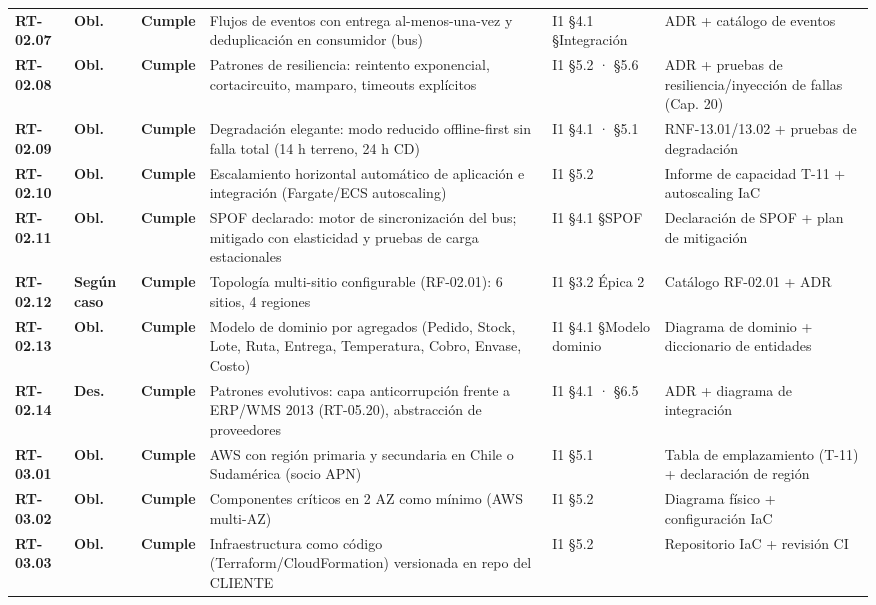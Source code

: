 \begin{small}
\begin{longtable}{@{}p{1.35cm} p{1.15cm} p{1.15cm} p{4.6cm} p{2.35cm} p{3.8cm}@{}}
\textbf{RT-02.07} & \textbf{Obl.} & \textbf{Cumple} & Flujos de eventos con entrega al-menos-una-vez y deduplicaci\'on en consumidor (bus) & I1 §4.1 §Integraci\'on & ADR + cat\'alogo de eventos \\
\textbf{RT-02.08} & \textbf{Obl.} & \textbf{Cumple} & Patrones de resiliencia: reintento exponencial, cortacircuito, mamparo, timeouts expl\'icitos & I1 §5.2 · §5.6 & ADR + pruebas de resiliencia/inyecci\'on de fallas (Cap. 20) \\
\textbf{RT-02.09} & \textbf{Obl.} & \textbf{Cumple} & Degradaci\'on elegante: modo reducido offline-first sin falla total (14 h terreno, 24 h CD) & I1 §4.1 · §5.1 & RNF-13.01/13.02 + pruebas de degradaci\'on \\
\textbf{RT-02.10} & \textbf{Obl.} & \textbf{Cumple} & Escalamiento horizontal autom\'atico de aplicaci\'on e integraci\'on (Fargate/ECS autoscaling) & I1 §5.2 & Informe de capacidad T-11 + autoscaling IaC \\
\textbf{RT-02.11} & \textbf{Obl.} & \textbf{Cumple} & SPOF declarado: motor de sincronizaci\'on del bus; mitigado con elasticidad y pruebas de carga estacionales & I1 §4.1 §SPOF & Declaraci\'on de SPOF + plan de mitigaci\'on \\
\textbf{RT-02.12} & \textbf{Según caso} & \textbf{Cumple} & Topolog\'ia multi-sitio configurable (RF-02.01): 6 sitios, 4 regiones & I1 §3.2 \'Epica 2 & Cat\'alogo RF-02.01 + ADR \\
\textbf{RT-02.13} & \textbf{Obl.} & \textbf{Cumple} & Modelo de dominio por agregados (Pedido, Stock, Lote, Ruta, Entrega, Temperatura, Cobro, Envase, Costo) & I1 §4.1 §Modelo dominio & Diagrama de dominio + diccionario de entidades \\
\textbf{RT-02.14} & \textbf{Des.} & \textbf{Cumple} & Patrones evolutivos: capa anticorrupci\'on frente a ERP/WMS 2013 (RT-05.20), abstracci\'on de proveedores & I1 §4.1 · §6.5 & ADR + diagrama de integraci\'on \\
\textbf{RT-03.01} & \textbf{Obl.} & \textbf{Cumple} & AWS con regi\'on primaria y secundaria en Chile o Sudam\'erica (socio APN) & I1 §5.1 & Tabla de emplazamiento (T-11) + declaraci\'on de regi\'on \\
\textbf{RT-03.02} & \textbf{Obl.} & \textbf{Cumple} & Componentes cr\'iticos en 2 AZ como m\'inimo (AWS multi-AZ) & I1 §5.2 & Diagrama f\'isico + configuraci\'on IaC \\
\textbf{RT-03.03} & \textbf{Obl.} & \textbf{Cumple} & Infraestructura como c\'odigo (Terraform/CloudFormation) versionada en repo del CLIENTE & I1 §5.2 & Repositorio IaC + revisi\'on CI \\

\end{longtable}
\end{small}
